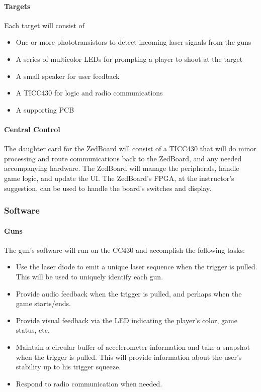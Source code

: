 \documentclass{article}
\begin{document}
\paragraph{Targets}

Each target will consist of
\begin{itemize}
\item One or more phototransistors to detect incoming laser signals from the guns
\item A series of multicolor LEDs for prompting a player to shoot at the target
\item A small speaker for user feedback
\item A TICC430 for logic and radio communications
\item A supporting PCB
\end{itemize}

\paragraph{Central Control}

The daughter card for the ZedBoard will consist of a TICC430 that will do minor processing and route communications
back to the ZedBoard, and any needed accompanying hardware.
The ZedBoard will manage the peripherals, handle game logic, and update the UI.
The ZedBoard's FPGA, at the instructor's suggestion, can be used to handle the board's switches and display.

\subsubsection{Software}

\paragraph{Guns}

The gun's software will run on the CC430 and accomplish the following tasks:
\begin{itemize}
\item Use the laser diode to emit a unique laser sequence when the trigger is pulled.
	This will be used to uniquely identify each gun.
\item Provide audio feedback when the trigger is pulled, and perhaps when the game starts/ends.
\item Provide visual feedback via the LED indicating the player's color, game status, etc.
\item Maintain a circular buffer of accelerometer information and take a snapshot when the trigger is pulled.
	This will provide information about the user's stability up to his trigger squeeze.
\item Respond to radio communication when needed.
\end{itemize}
\end{document}
